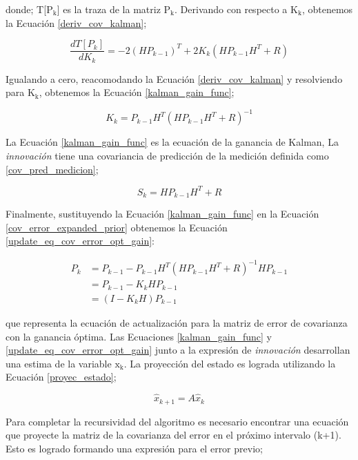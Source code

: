 \documentclass[10pt, a4paper]{report}
\begin{document}
donde; T[$\mathrm{P_k}$] es la traza de la matriz $\mathrm{P_k}$. Derivando con
respecto a $\mathrm{K_k}$, obtenemos la Ecuaci\'on \ref{deriv_cov_kalman};

\begin{equation}
    \frac{dT\left[P_k\right]}{dK_k} = -2\left(HP_{k-1}\right)^T + 2K_k\left(HP_{k-1}H^T + R\right) \label{deriv_cov_kalman}
\end{equation}

Igualando a cero, reacomodando la Ecuaci\'on \ref{deriv_cov_kalman} y
resolviendo para $\mathrm{K_k}$, obtenemos la Ecuaci\'on \ref{kalman_gain_func};

\begin{equation}
    K_k = P_{k-1}H^T\left(HP_{k-1}H^T + R\right)^{-1}\label{kalman_gain_func}
\end{equation}

La Ecuaci\'on \ref{kalman_gain_func} es la ecuaci\'on de la ganancia de Kalman,
La \emph{innovaci\'on} tiene una covariancia de predicci\'on de la medici\'on 
definida como \ref{cov_pred_medicion};

\begin{equation}
    S_k = HP_{k-1}H^T + R \label{cov_pred_medicion}
\end{equation}

Finalmente, sustituyendo la Ecuaci\'on \ref{kalman_gain_func} en la Ecuaci\'on 
\ref{cov_error_expanded_prior} obtenemos la Ecuaci\'on
\ref{update_eq_cov_error_opt_gain}:

\begin{align}
    P_k &= P_{k-1} - P_{k-1}H^T\left(HP_{k-1}H^T + R\right)^{-1}HP_{k-1}\nonumber\\
        &= P_{k-1} - K_kHP_{k-1} \nonumber \\
        &= (I - K_kH)P_{k-1} \label{update_eq_cov_error_opt_gain}
\end{align}

que representa la ecuaci\'on de actualizaci\'on para la matriz de error de
covarianza con la ganancia \'optima. Las Ecuaciones \ref{kalman_gain_func} y
\ref{update_eq_cov_error_opt_gain} junto a la expresi\'on de \emph{innovaci\'on}
desarrollan una estima de la variable $\mathrm{x_k}$. La proyecci\'on del estado
es lograda utilizando la Ecuaci\'on \ref{proyec_estado};

\begin{equation}
    \hat{x}_{k+1} = A\hat{x}_k\label{proyec_estado}
\end{equation}

Para completar la recursividad del algoritmo es necesario encontrar una
ecuaci\'on que proyecte la matriz de la covarianza del error en el pr\'oximo
intervalo (k+1). Esto es logrado formando una expresi\'on para el error previo;
\end{document}
